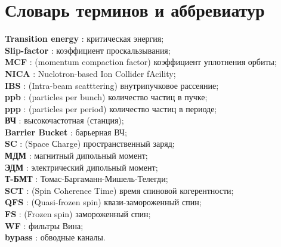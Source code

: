 \chapter*{Словарь терминов и аббревиатур}             %

\textbf{Transition energy} : критическая энергия;\\
\textbf{Slip-factor} : коэффициент проскальзывания;\\
\textbf{MCF} : (momentum compaction factor) коэффициент уплотнения орбиты;\\
\textbf{NICA} : Nuclotron-based Ion Collider fAcility;\\
\textbf{IBS} : (Intra-beam scatttering) внутрипучковое рассеяние;\\
\textbf{ppb} : (particles per bunch) количество частиц в пучке;\\
\textbf{ppp} : (particles per period) количество частиц в периоде;\\
\textbf{ВЧ} : высокочастотная (станция);\\
\textbf{Barrier Bucket} : барьерная ВЧ;\\
\textbf{SC} : (Space Сharge) пространственный заряд;\\
\textbf{МДМ} : магнитный дипольный момент;\\
\textbf{ЭДМ} : электрический дипольный момент;\\
\textbf{Т-БМТ} : Томас-Баргаманн-Мишель-Телегди;\\
\textbf{SCT} : (Spin Coherence Time) время спиновой когерентности;\\
\textbf{QFS} : (Quasi-frozen spin) квази-замороженный спин;\\
\textbf{FS} : (Frozen spin) замороженный спин;\\
\textbf{WF} : фильтры Вина;\\
\textbf{bypass} : обводные каналы.\\
